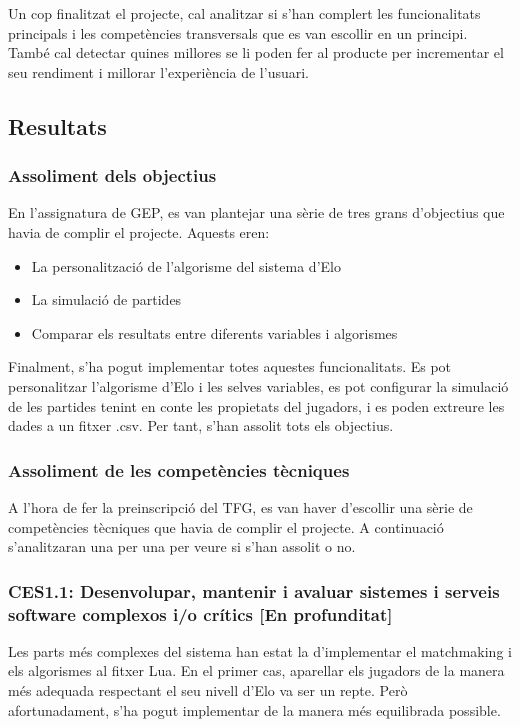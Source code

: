 \documentclass[a4paper]{article}
\begin{document}
Un cop finalitzat el projecte, cal analitzar si s'han complert les funcionalitats principals i les competències transversals que es van escollir en un principi. També cal detectar quines millores se li poden fer al producte per incrementar el seu rendiment i millorar l'experiència de l'usuari.

\subsection{Resultats}

\subsubsection{Assoliment dels objectius}
En l'assignatura de GEP, es van plantejar una sèrie de tres grans d'objectius que havia de complir el projecte. Aquests eren:

\begin{itemize}
    \item La personalització de l'algorisme del sistema d'Elo
    \item La simulació de partides
    \item Comparar els resultats entre diferents variables i algorismes
\end{itemize}   

Finalment, s'ha pogut implementar totes aquestes funcionalitats. Es pot personalitzar l'algorisme d'Elo i les selves variables, es pot configurar la simulació de les partides tenint en conte les propietats del jugadors, i es poden extreure les dades a un fitxer .csv. Per tant, s'han assolit tots els objectius.

\subsubsection{Assoliment de les competències tècniques}

A l'hora de fer la preinscripció del TFG, es van haver d'escollir una sèrie de competències tècniques que havia de complir el projecte. A continuació s'analitzaran una per una per veure si s'han assolit o no.

\subsubsection*{CES1.1: Desenvolupar, mantenir i avaluar sistemes i serveis software complexos i/o crítics [En profunditat]}

Les parts més complexes del sistema han estat la d'implementar el matchmaking i els algorismes al fitxer Lua. En el primer cas, aparellar els jugadors de la manera més adequada respectant el seu nivell d'Elo va ser un repte. Però afortunadament, s'ha pogut implementar de la manera més equilibrada possible.
\end{document}

